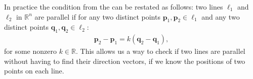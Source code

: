 \documentclass[letterpaper,10pt,english]{jupyterBook}
\begin{document}
\sphinxAtStartPar
In practice the condition from the {\hyperref[\detokenize{_pages/4.1_Lines:parallel-lines-definition}]{}} can be restated as follows: two lines \(\ell_1\) and \(\ell_2\) in \(\mathbb{R}^n\) are parallel if for any two distinct points \(\mathbf{p}_1, \mathbf{p}_2 \in \ell_1\) and any two distinct points \(\mathbf{q}_1, \mathbf{q}_2 \in \ell_2\):
\begin{equation*}
\begin{split} \mathbf{p}_2 - \mathbf{p}_1 = k(\mathbf{q}_2 - \mathbf{q}_1), \end{split}
\end{equation*}
\sphinxAtStartPar
for some non\sphinxhyphen{}zero \(k \in \mathbb{R}\). This allows us a way to check if two lines are parallel without having to find their direction vectors,  if we know the positions of two points on each line.
\label{_pages/4.1_Lines:parallel-lines-example}
\end{document}
